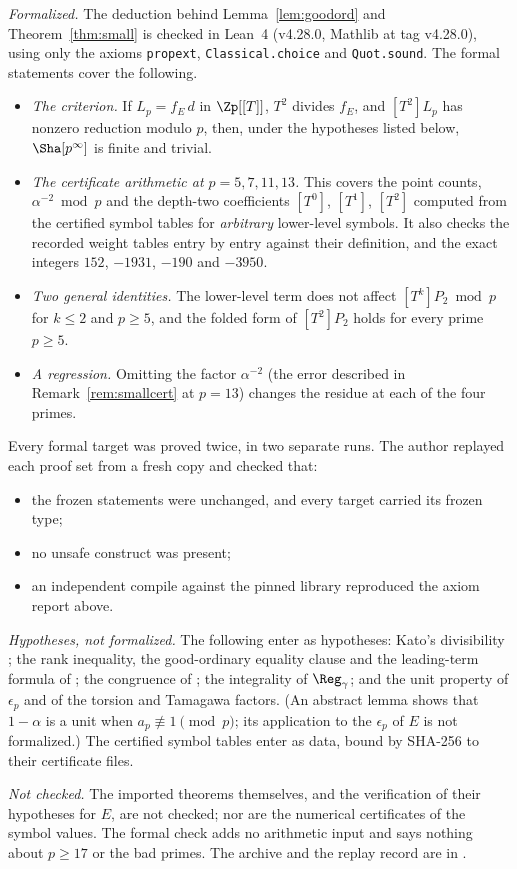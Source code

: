\begin{remark}\label{rem:a4lean}
\emph{Formalized.} The deduction behind Lemma~\ref{lem:goodord} and Theorem~\ref{thm:small} is checked in Lean~4 (v4.28.0, Mathlib at tag v4.28.0), using only the axioms \texttt{propext}, \texttt{Classical.choice} and \texttt{Quot.sound}. The formal statements cover the following.
\begin{itemize}[leftmargin=*]
\item \emph{The criterion.} If $L_p=f_E\,d$ in $\Zp[[T]]$, $T^2$ divides $f_E$, and $[T^2]L_p$ has nonzero reduction modulo $p$, then, under the hypotheses listed below, $\Sha[p^\infty]$ is finite and trivial.
\item \emph{The certificate arithmetic at $p=5,7,11,13$.} This covers the point counts, $\alpha^{-2}\bmod p$ and the depth-two coefficients $[T^0]$, $[T^1]$, $[T^2]$ computed from the certified symbol tables for \emph{arbitrary} lower-level symbols. It also checks the recorded weight tables entry by entry against their definition, and the exact integers $152$, $-1931$, $-190$ and $-3950$.
\item \emph{Two general identities.} The lower-level term does not affect $[T^k]P_2\bmod p$ for $k\le2$ and $p\ge5$, and the folded form of $[T^2]P_2$ holds for every prime $p\ge5$.
\item \emph{A regression.} Omitting the factor $\alpha^{-2}$ (the error described in Remark~\ref{rem:smallcert} at $p=13$) changes the residue at each of the four primes.
\end{itemize}
Every formal target was proved twice, in two separate runs. The author replayed each proof set from a fresh copy and checked that:
\begin{itemize}[leftmargin=*]
\item the frozen statements were unchanged, and every target carried its frozen type;
\item no unsafe construct was present;
\item an independent compile against the pinned library reproduced the axiom report above.
\end{itemize}

\emph{Hypotheses, not formalized.} The following enter as hypotheses: Kato's divisibility \cite[Thm.~7.3]{sw}; the rank inequality, the good-ordinary equality clause and the leading-term formula of \cite[Thm.~6.1]{sw}; the congruence of \cite[Prop.~3.5]{sw}; the integrality of $\Reg_\gamma$; and the unit property of $\epsilon_p$ and of the torsion and Tamagawa factors. (An abstract lemma shows that $1-\alpha$ is a unit when $a_p\not\equiv1\pmod p$; its application to the $\epsilon_p$ of $E$ is not formalized.) The certified symbol tables enter as data, bound by SHA-256 to their certificate files.

\emph{Not checked.} The imported theorems themselves, and the verification of their hypotheses for $E$, are not checked; nor are the numerical certificates of the symbol values. The formal check adds no arithmetic input and says nothing about $p\ge17$ or the bad primes. The archive and the replay record are in .
\end{remark}

